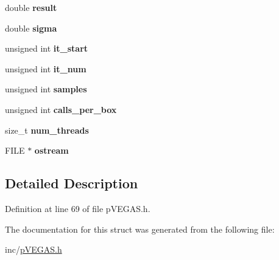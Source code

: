 \begin{DoxyCompactItemize}
\item 
\hypertarget{structpVEGAS_1_1gsl__monte__vegas__state_ab773910457bfec6c983a389d1714c4b6}{}double {\bfseries result}\label{structpVEGAS_1_1gsl__monte__vegas__state_ab773910457bfec6c983a389d1714c4b6}

\item 
\hypertarget{structpVEGAS_1_1gsl__monte__vegas__state_aca33e0298b14ffcb4fbf45df4ca4d41a}{}double {\bfseries sigma}\label{structpVEGAS_1_1gsl__monte__vegas__state_aca33e0298b14ffcb4fbf45df4ca4d41a}

\item 
\hypertarget{structpVEGAS_1_1gsl__monte__vegas__state_ae4e55b3cc72ef59e0a40c47f52976c66}{}unsigned int {\bfseries it\+\_\+start}\label{structpVEGAS_1_1gsl__monte__vegas__state_ae4e55b3cc72ef59e0a40c47f52976c66}

\item 
\hypertarget{structpVEGAS_1_1gsl__monte__vegas__state_aa1a2ebd4a0a5d122a313772428f2a0ea}{}unsigned int {\bfseries it\+\_\+num}\label{structpVEGAS_1_1gsl__monte__vegas__state_aa1a2ebd4a0a5d122a313772428f2a0ea}

\item 
\hypertarget{structpVEGAS_1_1gsl__monte__vegas__state_a60d520a64ceb65614d546bb53a2a6312}{}unsigned int {\bfseries samples}\label{structpVEGAS_1_1gsl__monte__vegas__state_a60d520a64ceb65614d546bb53a2a6312}

\item 
\hypertarget{structpVEGAS_1_1gsl__monte__vegas__state_ac66ba96628f4a1f54086f63723205d0a}{}unsigned int {\bfseries calls\+\_\+per\+\_\+box}\label{structpVEGAS_1_1gsl__monte__vegas__state_ac66ba96628f4a1f54086f63723205d0a}

\item 
\hypertarget{structpVEGAS_1_1gsl__monte__vegas__state_a25f3309b26c45774a9a7f5ab2b79dad1}{}size\+\_\+t {\bfseries num\+\_\+threads}\label{structpVEGAS_1_1gsl__monte__vegas__state_a25f3309b26c45774a9a7f5ab2b79dad1}

\item 
\hypertarget{structpVEGAS_1_1gsl__monte__vegas__state_a7a2be2f94c124e06e0acbdcc824770f9}{}F\+I\+L\+E $\ast$ {\bfseries ostream}\label{structpVEGAS_1_1gsl__monte__vegas__state_a7a2be2f94c124e06e0acbdcc824770f9}

\end{DoxyCompactItemize}


\subsection{Detailed Description}


Definition at line 69 of file p\+V\+E\+G\+A\+S.\+h.



The documentation for this struct was generated from the following file\+:\begin{DoxyCompactItemize}
\item 
inc/\hyperlink{pVEGAS_8h}{p\+V\+E\+G\+A\+S.\+h}\end{DoxyCompactItemize}
